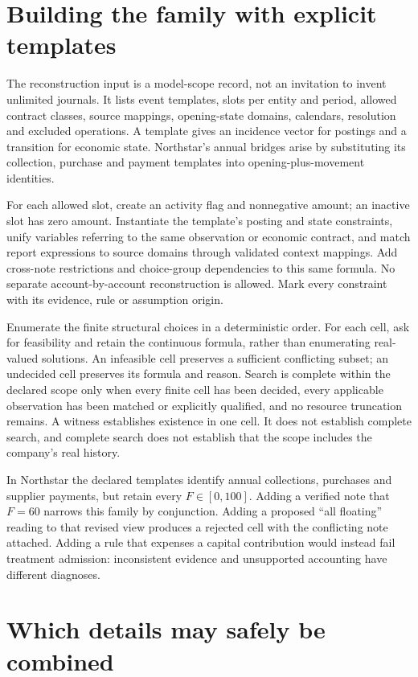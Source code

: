 \section{Building the family with explicit templates}

The reconstruction input is a model-scope record, not an invitation to invent
unlimited journals. It lists event templates, slots per entity and period,
allowed contract classes, source mappings, opening-state domains, calendars,
resolution and excluded operations. A template gives an incidence vector for
postings and a transition for economic state. Northstar's annual bridges
arise by substituting its collection, purchase and payment templates into
opening-plus-movement identities.

For each allowed slot, create an activity flag and nonnegative amount; an
inactive slot has zero amount. Instantiate the template's posting and state
constraints, unify variables referring to the same observation or economic
contract, and match report expressions to source domains through validated
context mappings. Add cross-note restrictions and choice-group dependencies
to this same formula. No separate account-by-account reconstruction is allowed.
Mark every constraint with its evidence, rule or assumption origin.

Enumerate the finite structural choices in a deterministic order. For each
cell, ask for feasibility and retain the continuous formula, rather than
enumerating real-valued solutions. An infeasible cell preserves a sufficient
conflicting subset; an undecided cell preserves its formula and reason. Search
is complete within the declared scope only when every finite cell has been
decided, every applicable observation has been matched or explicitly qualified,
and no resource truncation remains. A witness establishes existence in one
cell. It does not establish complete search, and complete search does not
establish that the scope includes the company's real history.

In Northstar the declared templates identify annual collections, purchases
and supplier payments, but retain every $F\in[0,100]$. Adding a verified note
that $F=60$ narrows this family by conjunction. Adding a proposed ``all floating''
reading to that revised view produces a rejected cell with the conflicting
note attached. Adding a rule that expenses a capital contribution would instead
fail treatment admission: inconsistent evidence and unsupported accounting
have different diagnoses.

\section{Which details may safely be combined}

